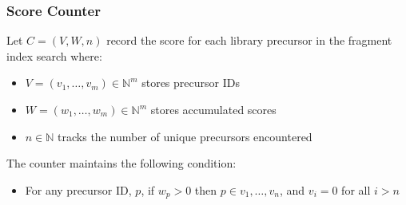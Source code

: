 \documentclass[pdflatex,sn-nature]{sn-jnl}
\begin{document}
\subsubsection{Score Counter}\label{subsubsec:score-counter}
Let $C = (V, W, n)$ record the score for each library precursor in the fragment index search where:
\begin{itemize}
    \item $V = (v_1,\ldots,v_m) \in \mathbb{N}^m$ stores precursor IDs
    \item $W = (w_1,\ldots,w_m) \in \mathbb{N}^m$ stores accumulated scores
    \item $n \in \mathbb{N}$ tracks the number of unique precursors encountered
\end{itemize}
The counter maintains the following condition:
\begin{itemize}
\item For any precursor ID, $p$, if $w_p > 0$ then $p \in {v_1,\ldots,v_n}$, and 
$v_i = 0$ for all $i > n$
\end{itemize}

\end{document}

